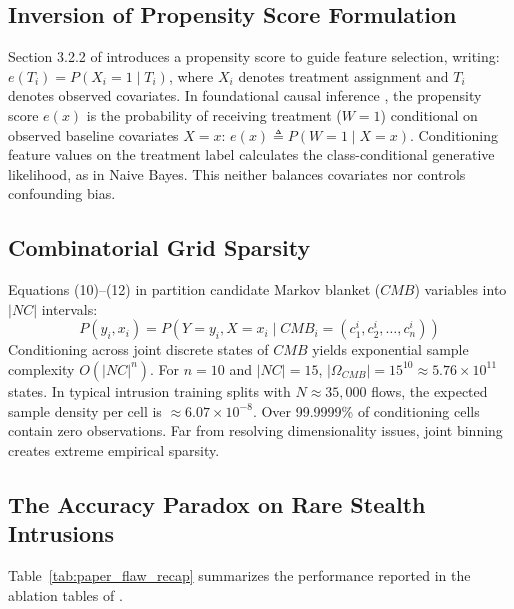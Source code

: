 \documentclass[5p,times,twocolumn]{elsarticle}
\begin{document}
\subsection{Inversion of Propensity Score Formulation}
Section 3.2.2 of \cite{gao2025irids} introduces a propensity score to guide feature selection, writing: $e(T_i) = P(X_i = 1 \mid T_i)$, where $X_i$ denotes treatment assignment and $T_i$ denotes observed covariates. In foundational causal inference \cite{rosenbaum1983central}, the propensity score $e(x)$ is the probability of receiving treatment ($W = 1$) conditional on observed baseline covariates $X = x$: $e(x) \triangleq P(W = 1 \mid X = x)$. Conditioning feature values on the treatment label calculates the class-conditional generative likelihood, as in Naive Bayes. This neither balances covariates nor controls confounding bias.

\subsection{Combinatorial Grid Sparsity}
Equations (10)--(12) in \cite{gao2025irids} partition candidate Markov blanket ($CMB$) variables into $|NC|$ intervals:
\begin{equation}
P(y_i, x_i) = P(Y = y_i, X = x_i \mid CMB_i = (c_1^i, c_2^i, \dots, c_n^i))
\end{equation}
Conditioning across joint discrete states of $CMB$ yields exponential sample complexity $O(|NC|^n)$. For $n = 10$ and $|NC| = 15$, $|\Omega_{CMB}| = 15^{10} \approx 5.76 \times 10^{11}$ states. In typical intrusion training splits with $N \approx 35,000$ flows, the expected sample density per cell is $\approx 6.07 \times 10^{-8}$. Over 99.9999\% of conditioning cells contain zero observations. Far from resolving dimensionality issues, joint binning creates extreme empirical sparsity.

\subsection{The Accuracy Paradox on Rare Stealth Intrusions}
Table~\ref{tab:paper_flaw_recap} summarizes the performance reported in the ablation tables of \cite{gao2025irids}.
\end{document}
